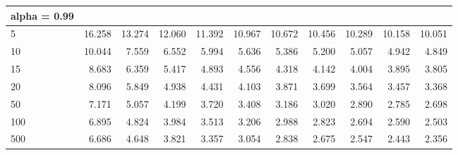 \documentclass[
  11pt,
]{book}
\theoremstyle{definition}
\theoremstyle{definition}
\theoremstyle{definition}
\theoremstyle{definition}
\theoremstyle{remark}
\begin{document}
\begin{table}
\begin{tabular}[t]{l|r|r|r|r|r|r|r|r|r|r}
\hline
alpha = 0.99 &  &  &  &  &  &  &  &  &  & \\
\hline
5 & 16.258 & 13.274 & 12.060 & 11.392 & 10.967 & 10.672 & 10.456 & 10.289 & 10.158 & 10.051\\
\hline
10 & 10.044 & 7.559 & 6.552 & 5.994 & 5.636 & 5.386 & 5.200 & 5.057 & 4.942 & 4.849\\
\hline
15 & 8.683 & 6.359 & 5.417 & 4.893 & 4.556 & 4.318 & 4.142 & 4.004 & 3.895 & 3.805\\
\hline
20 & 8.096 & 5.849 & 4.938 & 4.431 & 4.103 & 3.871 & 3.699 & 3.564 & 3.457 & 3.368\\
\hline
50 & 7.171 & 5.057 & 4.199 & 3.720 & 3.408 & 3.186 & 3.020 & 2.890 & 2.785 & 2.698\\
\hline
100 & 6.895 & 4.824 & 3.984 & 3.513 & 3.206 & 2.988 & 2.823 & 2.694 & 2.590 & 2.503\\
\hline
500 & 6.686 & 4.648 & 3.821 & 3.357 & 3.054 & 2.838 & 2.675 & 2.547 & 2.443 & 2.356\\
\hline
\end{tabular}
\end{table}

  
\end{document}
